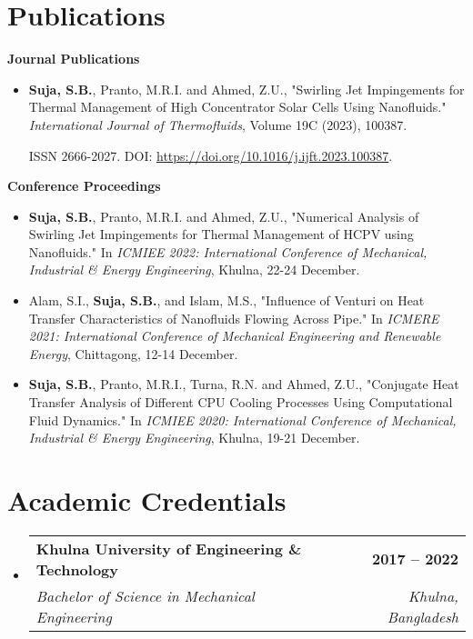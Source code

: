 \documentclass[letterpaper,11pt]{article}
\makeatletter
\newcommand{\resumeItem}[1]{
  \item\small{
    {#1 \vspace{-2pt}}
  }
}
\newcommand{\resumeSubheading}[4]{
  \vspace{-2pt}\item
    \begin{tabular*}{1.0\textwidth}[t]{l@{\extracolsep{\fill}}r}
      \textbf{#1} & \textbf{\small #2} \\
      \textit{\small#3} & \textit{\small #4} \\
    \end{tabular*}\vspace{-5pt}
}
\newcommand{\resumeSubHeadingListStart}{\begin{itemize}[leftmargin=0.0in, label={}]}
\newcommand{\resumeSubHeadingListEnd}{\end{itemize}}
\newcommand{\resumeItemListStart}{\begin{itemize}}
\newcommand{\resumeItemListEnd}{\end{itemize}\vspace{-5pt}}
\makeatother
\begin{document}
\section{Publications}
\begin{itemize}[leftmargin=0in, label={}]
{\item{\textbf{Journal Publications}}}
\resumeItemListStart
\resumeItem{\textbf{Suja, S.B.}, Pranto, M.R.I. and Ahmed, Z.U., "Swirling Jet Impingements for Thermal Management of High Concentrator Solar Cells Using Nanofluids." 
\textit{International Journal of Thermofluids}, Volume 19C (2023), 100387.}
ISSN 2666-2027. DOI: \url{https://doi.org/10.1016/j.ijft.2023.100387}.
\resumeItemListEnd
\vspace{-2pt}

{\item{\textbf{Conference Proceedings}}}
\resumeItemListStart
\resumeItem{\textbf{Suja, S.B.}, Pranto, M.R.I. and Ahmed, Z.U., "Numerical Analysis of Swirling Jet Impingements for Thermal Management of HCPV using Nanofluids." 
In \textit{ICMIEE 2022: International Conference of Mechanical, Industrial \& Energy Engineering}, Khulna, 22-24 December.}
\resumeItem{Alam, S.I., \textbf{Suja, S.B.}, and Islam, M.S., "Influence of Venturi on Heat Transfer Characteristics of Nanofluids Flowing Across Pipe." 
In \textit{ICMERE 2021: International Conference of Mechanical Engineering and Renewable Energy}, Chittagong, 12-14 December.}
\resumeItem{\textbf{Suja, S.B.}, Pranto, M.R.I., Turna, R.N. and Ahmed, Z.U., "Conjugate Heat Transfer Analysis of Different CPU Cooling Processes Using Computational Fluid Dynamics." 
In \textit{ICMIEE 2020: International Conference of Mechanical, Industrial \& Energy Engineering}, Khulna, 19-21 December.}
\resumeItemListEnd
\end{itemize}

\section{Academic Credentials}
\resumeSubHeadingListStart
\resumeSubheading
{Khulna University of Engineering \& Technology}{2017 -- 2022}
{Bachelor of Science in Mechanical Engineering}{Khulna, Bangladesh}
\resumeSubHeadingListEnd
\end{document}
